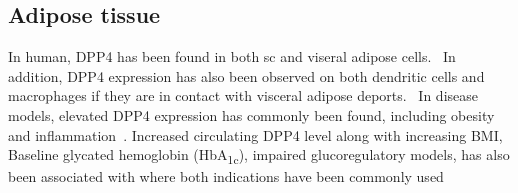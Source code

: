 \subsection{Adipose tissue}
In human, DPP4 has been found in both sc and viseral adipose cells.~\cite{Lamers2011} In addition, DPP4 expression has also been observed on both dendritic cells and macrophages if they are in contact with visceral adipose deports.~\cite{Zhong2013} In disease models, elevated DPP4 expression has commonly been found, including obesity and inflammation~\cite{Zhong2013}. Increased circulating DPP4 level along with increasing BMI, Baseline glycated hemoglobin (HbA\textsubscript{1c}),\cite{2011} impaired glucoregulatory models,  has also been associated with where both indications have been commonly used 